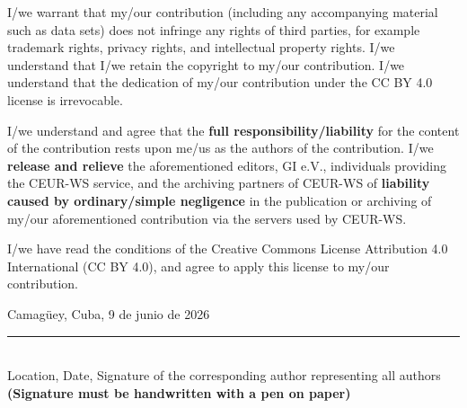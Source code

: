 \documentclass[a4paper,10pt]{article}
\begin{document}
\vspace{0.2cm}
\noindent
{\footnotesize I/we warrant that my/our contribution (including any accompanying material such as data sets) does not infringe any rights of third parties, for example trademark rights, privacy rights, and intellectual property rights. I/we understand that I/we retain the copyright to my/our contribution. I/we understand that the dedication of my/our contribution under the CC BY 4.0 license is irrevocable.\par}

\noindent
{\footnotesize I/we understand and agree that the \textbf{full responsibility/liability} for the content of the contribution rests upon me/us as the authors of the contribution. I/we \textbf{release and relieve} the aforementioned editors, GI e.V., individuals providing the CEUR-WS service, and the archiving partners of CEUR-WS of \textbf{liability caused by ordinary/simple negligence} in the publication or archiving of my/our aforementioned contribution via the servers used by CEUR-WS.\par}

\noindent
{\footnotesize I/we have read the conditions of the Creative Commons License Attribution 4.0 International (CC BY 4.0), and agree to apply this license to my/our contribution.\par}

\vspace{1.0cm}

\noindent Camag\"uey, Cuba, 9 de junio de 2026 \hspace{3.2cm} \rule{0.4\textwidth}{0.4pt} \\
Location, Date, Signature of the corresponding author representing all authors \\
\textbf{(Signature must be handwritten with a pen on paper)}
\end{document}
